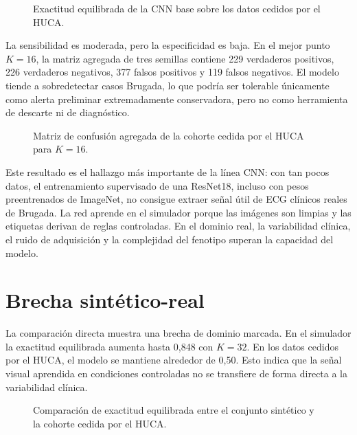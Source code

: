 \begin{figure}[H]
  \centering
  \caption{Exactitud equilibrada de la CNN base sobre los datos cedidos por el HUCA.}
  \label{fig:cnn_huca_ba}
\end{figure}

La sensibilidad es moderada, pero la especificidad es baja. En el mejor punto \(K=16\), la matriz agregada de tres semillas contiene 229 verdaderos positivos, 226 verdaderos negativos, 377 falsos positivos y 119 falsos negativos. El modelo tiende a sobredetectar casos Brugada, lo que podría ser tolerable únicamente como alerta preliminar extremadamente conservadora, pero no como herramienta de descarte ni de diagnóstico.

\begin{figure}[H]
  \centering
  \caption{Matriz de confusión agregada de la cohorte cedida por el HUCA para \(K=16\).}
  \label{fig:cnn_huca_confusion}
\end{figure}

Este resultado es el hallazgo más importante de la línea CNN: con tan pocos datos, el entrenamiento supervisado de una ResNet18, incluso con pesos preentrenados de ImageNet, no consigue extraer señal útil de ECG clínicos reales de Brugada. La red aprende en el simulador porque las imágenes son limpias y las etiquetas derivan de reglas controladas. En el dominio real, la variabilidad clínica, el ruido de adquisición y la complejidad del fenotipo superan la capacidad del modelo.

\section{Brecha sintético-real}

La comparación directa muestra una brecha de dominio marcada. En el simulador la exactitud equilibrada aumenta hasta 0,848 con \(K=32\). En los datos cedidos por el HUCA, el modelo se mantiene alrededor de 0,50. Esto indica que la señal visual aprendida en condiciones controladas no se transfiere de forma directa a la variabilidad clínica.

\begin{figure}[H]
  \centering
  \caption{Comparación de exactitud equilibrada entre el conjunto sintético y la cohorte cedida por el HUCA.}
  \label{fig:sim_vs_real_ba}
\end{figure}

